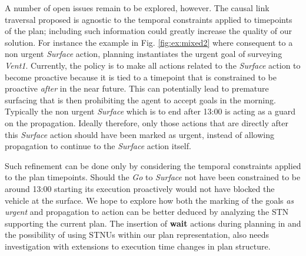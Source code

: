 A number of open issues remain to be explored, however. The causal
link traversal proposed is agnostic to the temporal constraints
applied to timepoints of the plan; including such information could
greatly increase the quality of our solution.  
For instance the example in Fig. \ref{fig:ex:mixed2} where consequent
to a non urgent {\em Surface} action, planning instantiates the urgent
goal of surveying \emph{Vent1}. Currently, the policy is to make all
actions related to the {\em Surface} action to become proactive
because it is tied to a timepoint that is constrained to be proactive
{\em after} in the near future.
This can potentially lead to premature surfacing that is then
prohibiting the agent to accept goals in the morning. Typically the
non urgent {\em Surface} which is to end after 13:00 is acting as a
guard on the propagation.
Ideally therefore, only those actions that are directly after this
{\em Surface} action should have been marked as urgent, instead of
allowing propagation to continue to the {\em Surface} action itself.

Such refinement can be done only by considering the temporal
constraints applied to the plan timepoints. Should the {\em Go} to
{\em Surface} not have been constrained to be around 13:00 starting
its execution proactively would not have blocked the vehicle at the
surface. We hope to explore how both the marking of the goals {\em as
  urgent} and propagation to action can be better deduced by analyzing
the STN supporting the current plan. The insertion of {\bf wait}
actions during planning in \cite{morris01} and the possibility of
using STNUs within our plan representation, also needs investigation
with extensions to execution time changes in plan structure.

